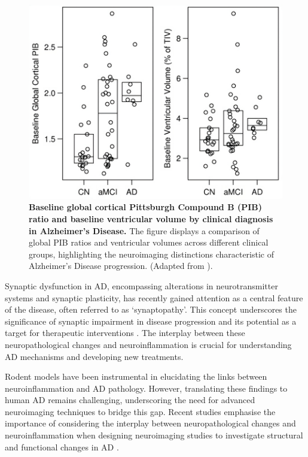 \documentclass[10pt]{article}
\begin{document}
\begin{sloppypar}
  \begin{figure}[ht]
    \centering
    \includegraphics[width=\textwidth]{figures/pib-ratio.png}
    \caption[Baseline global cortical Pittsburgh Compound B (PIB) ratio and baseline ventricular volume by clinical diagnosis in Alzheimer's Disease.]{\textbf{Baseline global cortical Pittsburgh Compound B (PIB) ratio and baseline ventricular volume by clinical diagnosis in Alzheimer's Disease.} The figure displays a comparison of global PIB ratios and ventricular volumes across different clinical groups, highlighting the neuroimaging distinctions characteristic of Alzheimer’s Disease progression. (Adapted from \cite{jack_serial_2009}).}
    \label{fig:pib-ratio}
  \end{figure}

  Synaptic dysfunction in AD, encompassing alterations in neurotransmitter systems and synaptic plasticity, has recently gained attention as a central feature of the disease, often referred to as ‘synaptopathy’. This concept underscores the significance of synaptic impairment in disease progression and its potential as a target for therapeutic interventions \citep{meftah_alzheimers_2023}. The interplay between these neuropathological changes and neuroinflammation is crucial for understanding AD mechanisms and developing new treatments.

  Rodent models have been instrumental in elucidating the links between neuroinflammation and AD pathology. However, translating these findings to human AD remains challenging, underscoring the need for advanced neuroimaging techniques to bridge this gap. Recent studies emphasise the importance of considering the interplay between neuropathological changes and neuroinflammation when designing neuroimaging studies to investigate structural and functional changes in AD \citep{nazem_rodent_2015}.


\end{sloppypar}
\end{document}
